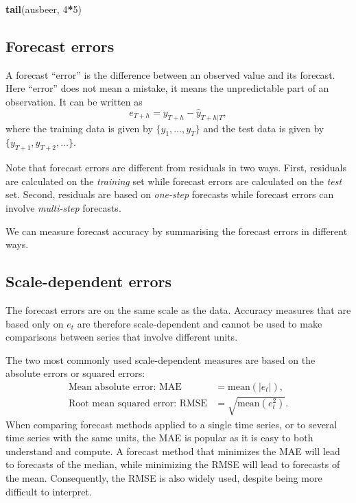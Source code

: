 \documentclass[]{book}
\newenvironment{Shaded}{\begin{snugshade}}{\end{snugshade}}
\newcommand{\DecValTok}[1]{\textcolor[rgb]{0.00,0.00,0.81}{#1}}
\newcommand{\KeywordTok}[1]{\textcolor[rgb]{0.13,0.29,0.53}{\textbf{#1}}}
\newcommand{\NormalTok}[1]{#1}
\newcommand{\OperatorTok}[1]{\textcolor[rgb]{0.81,0.36,0.00}{\textbf{#1}}}
\begin{document}
\begin{Shaded}
\begin{Highlighting}[]
\KeywordTok{tail}\NormalTok{(ausbeer, }\DecValTok{4}\OperatorTok{*}\DecValTok{5}\NormalTok{)}
\end{Highlighting}
\end{Shaded}

\hypertarget{forecast-errors}{%
\subsection*{Forecast errors}\label{forecast-errors}}

A forecast ``error'' is the difference between an observed value and its forecast. Here ``error'' does not mean a mistake, it means the unpredictable part of an observation. It can be written as
\[
  e_{T+h} = y_{T+h} - \hat{y}_{T+h|T},
\]
where the training data is given by \(\{y_1,\dots,y_T\}\) and the test data is given by \(\{y_{T+1},y_{T+2},\dots\}\).

Note that forecast errors are different from residuals in two ways. First, residuals are calculated on the \emph{training} set while forecast errors are calculated on the \emph{test} set. Second, residuals are based on \emph{one-step} forecasts while forecast errors can involve \emph{multi-step} forecasts.

We can measure forecast accuracy by summarising the forecast errors in different ways.

\hypertarget{scale-dependent-errors}{%
\subsection*{Scale-dependent errors}\label{scale-dependent-errors}}

The forecast errors are on the same scale as the data. Accuracy measures that are based only on \(e_{t}\) are therefore scale-dependent and cannot be used to make comparisons between series that involve different units.

The two most commonly used scale-dependent measures are based on the absolute errors or squared errors:
\begin{align*}
  \text{Mean absolute error: MAE} & = \text{mean}(|e_{t}|),\\
  \text{Root mean squared error: RMSE} & = \sqrt{\text{mean}(e_{t}^2)}.
\end{align*}
When comparing forecast methods applied to a single time series, or to several time series with the same units, the MAE is popular as it is easy to both understand and compute. A forecast method that minimizes the MAE will lead to forecasts of the median, while minimizing the RMSE will lead to forecasts of the mean. Consequently, the RMSE is also widely used, despite being more difficult to interpret.
\end{document}
